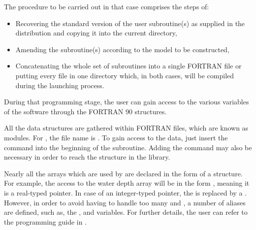 The procedure to be carried out in that case comprises the steps of:

\begin{itemize}
\item Recovering the standard version of the user subroutine(s) as supplied in
the distribution and copying it into the current directory,
\item Amending the subroutine(s) according to the model to be constructed,
\item Concatenating the whole set of subroutines into a single FORTRAN file
or putting every file in one directory
which, in both cases,
will be compiled during the  launching process.
\end{itemize}

During that programming stage, the user can gain access to the various
variables of the software through the FORTRAN 90 structures.

All the data structures are gathered within FORTRAN files, which are known as
modules. For , the file name is . To gain
access to the  data, just insert the command  into the beginning of the subroutine. Adding the
command  may also be necessary in order to reach the structure in the
\bief library.

Nearly all the arrays which are used by  are declared in the form of
a structure. For example, the access to the water depth array will be in the
form ,  meaning it is a real-typed pointer.
In case of an integer-typed pointer, the  is replaced by a .
However, in order to avoid having to handle too many  and ,
a number of aliases are defined, such as, the ,  and
 variables. For further details, the user can refer to
the programming guide in \tel \cite{HervouetProg2009}.
